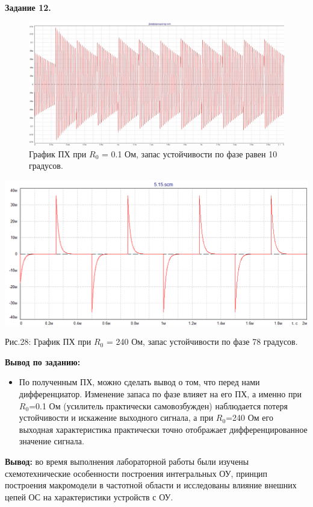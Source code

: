 \documentclass[a4paper,14pt]{extarticle}
\begin{document}
    \newpage
    \begin{center}
        \textbf{Задание 12.}
    \end{center}

    \begin{figure}[h!]
        \begin{center}
            \includegraphics[scale=0.3]{30.jpeg}
        \end{center}
        \vspace{-0.7cm}
        \caption{График ПХ при $R_0$ = 0.1 Ом, запас устойчивости по фазе равен 10 градусов.}
    \end{figure}

    \begin{center}
        \includegraphics[scale=0.5]{31.png}
    \end{center}
    \vspace{-0.7cm}
    Рис.28: График ПХ при $R_0$ = 240 Ом, запас устойчивости по фазе 78 градусов.

   \textbf{Вывод по заданию:}
   \begin{itemize}
       \item По полученным ПХ, можно сделать вывод о том, что перед нами дифференциатор. Изменение запаса по фазе влияет на его ПХ, а именно при $R_0$=0.1 Ом (усилитель практически самовозбужден) наблюдается потеря устойчивости и искажение выходного сигнала, а при $R_0$=240 Ом его выходная характеристика практически точно отображает дифференцированное значение сигнала.
   \end{itemize}

    \textbf{Вывод:} во время выполнения лабораторной работы были изучены 
    схемотехнические особенности построения интегральных ОУ, принцип 
    построения макромодели в частотной области и исследованы влияние 
    внешних цепей ОС на характеристики устройств с ОУ. 
    
\end{document}
